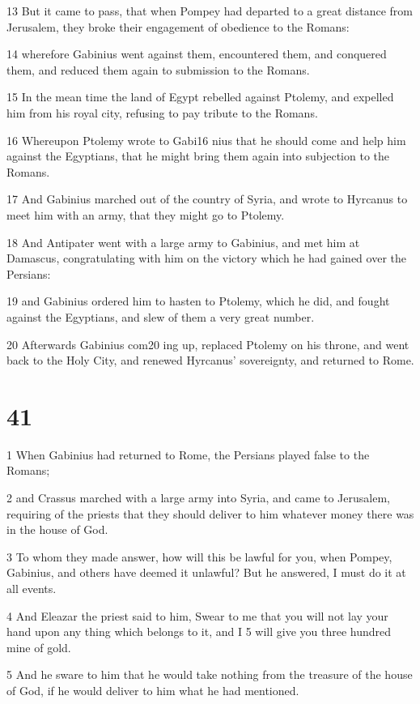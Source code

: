 13 But it came to pass, that when Pompey had departed to a great distance from Jerusalem, they broke their engagement of obedience to the Romans: 

14 wherefore Gabinius went against them, encountered them, and conquered them, and reduced them again to submission to the Romans. 

15 In the mean time the land of Egypt rebelled against Ptolemy, and expelled him from his royal city, refusing to pay tribute to the Romans. 

16 Whereupon Ptolemy wrote to Gabi16 nius that he should come and help him against the Egyptians, that he might bring them again into subjection to the Romans. 

17 And Gabinius marched out of the country of Syria, and wrote to Hyrcanus to meet him with an army, that they might go to Ptolemy. 

18 And Antipater went with a large army to Gabinius, and met him at Damascus, congratulating with him on the victory which he had gained over the Persians: 

19 and Gabinius ordered him to hasten to Ptolemy, which he did, and fought against the Egyptians, and slew of them a very great number. 

20 Afterwards Gabinius com20 ing up, replaced Ptolemy on his throne, and went back to the Holy City, and renewed Hyrcanus’ sovereignty, and returned to Rome. 


\chapter{41}

\par {}

1 When Gabinius had returned to Rome, the Persians played false to the Romans; 

2 and Crassus marched with a large army into Syria, and came to Jerusalem, requiring of the priests that they should deliver to him whatever money there was in the house of God. 

3 To whom they made answer, how will this be lawful for you, when Pompey, Gabinius, and others have deemed it unlawful? But he answered, I must do it at all events. 

4 And Eleazar the priest said to him, Swear to me that you will not lay your hand upon any thing which belongs to it, and I 5 will give you three hundred mine of gold. 

5 And he sware to him that he would take nothing from the treasure of the house of God, if he would deliver to him what he had mentioned. 

